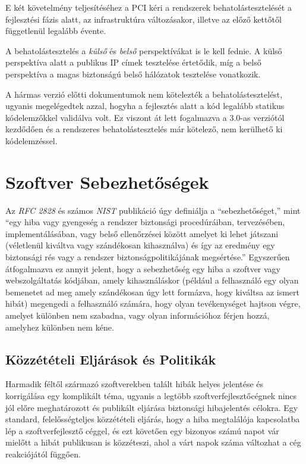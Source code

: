 \documentclass[a4paper,12pt]{article}
\begin{document}
	E két követelmény teljesítéséhez a PCI kéri a rendszerek behatolástesztelését a fejlesztési fázis alatt, az infrastruktúra változásakor, illetve az előző kettőtől függetlenül legalább évente.
	
	A behatolástesztelés a \textit{külső} és \textit{belső} perspektívákat is le kell fednie. A külső perspektíva alatt a publikus IP címek tesztelése értetődik, míg a belső perspektíva a magas biztonságú belső hálózatok tesztelése vonatkozik.
	
	A hármas verzió előtti dokumentumok nem kötelezték a behatolástesztelést, ugyanis megelégedtek azzal, hogyha a fejlesztés alatt a kód legalább statikus kódelemzőkkel validálva volt. Ez viszont át lett fogalmazva a 3.0-as verziótól kezdődően és a rendszeres behatolástesztelés már kötelező, nem kerülhető ki kódelemzéssel.
	
\section{Szoftver Sebezhetőségek}
	
	Az \textit{RFC 2828} és számos \textit{NIST} publikáció úgy definiálja a ``sebezhetőséget,'' mint ``egy hiba vagy gyengeség a rendszer biztonsági procedúráiban, tervezésében, implementálásában, vagy belső ellenőrzései között amelyet ki lehet játszani (véletlenül kiváltva vagy szándékosan kihasználva) és így az eredmény egy biztonsági rés vagy a rendszer biztonságpolitikájának megsértése.''\cite{rfc2828,nist80030} Egyszerűen átfogalmazva ez annyit jelent, hogy a sebezhetőség egy hiba a szoftver vagy webszolgáltatás kódjában, amely kihasználáskor (például a felhasználó egy olyan bemenetet ad meg amely szándékosan úgy lett formázva, hogy kiváltsa az ismert hibát) megengedi a felhasználó számára, hogy olyan tevékenységet hajtson végre, amelyet különben nem szabadna, vagy olyan információhoz férjen hozzá, amelyhez különben nem kéne.
	
\subsection{Közzétételi Eljárások és Politikák}
	
	Harmadik féltől származó szoftverekben talált hibák helyes jelentése és korrigálása egy komplikált téma, ugyanis a legtöbb szoftverfejlesztőcégnek nincs jól előre meghatározott és publikált eljárása biztonsági hibajelentés célokra. Egy standard, felelősségteljes közzétételi eljárás, hogy a hiba megtalálója kapcsolatba lép a szoftverfejlesztő céggel, és ezt követően egy bizonyos számú napot vár mielőtt a hibát publikusan is közzéteszi, ahol a várt napok száma változhat a cég reakciójától függően.
	
\end{document}
